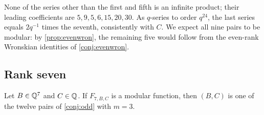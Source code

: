 None of the series other than the first and fifth is an infinite product; their leading coefficients are $5,9,5,6,15,20,30$. As $q$-series to order $q^{24}$, the last series equals $2q^{-1}$ times the seventh, consistently with $C$. We expect all nine pairs to be modular: by \cref{prop:evenwron}, the remaining five would follow from the even-rank Wronskian identities of \cref{conj:evenwron}.

\subsection{Rank seven}

\begin{theorem}\label{thm:r7nec}
Let $B\in\mathbb{Q}^7$ and $C\in\mathbb{Q}$. If $F_{7,B,C}$ is a modular function, then $(B,C)$ is one of the twelve pairs of \cref{conj:odd} with $m=3$.
\end{theorem}

